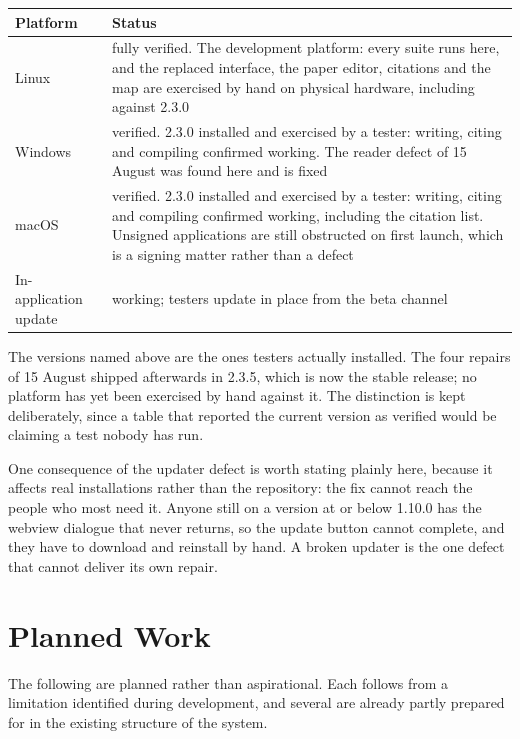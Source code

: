 \documentclass[11pt,a4paper]{article}
\begin{document}
\begin{center}
\small
\begin{tabularx}{\linewidth}{@{}lX@{}}
\toprule
\textbf{Platform} & \textbf{Status} \\
\midrule
Linux & fully verified. The development platform: every suite runs here, and the replaced interface, the paper editor, citations and the map are exercised by hand on physical hardware, including against 2.3.0 \\
Windows & verified. 2.3.0 installed and exercised by a tester: writing, citing and compiling confirmed working. The reader defect of 15 August was found here and is fixed \\
macOS & verified. 2.3.0 installed and exercised by a tester: writing, citing and compiling confirmed working, including the citation list. Unsigned applications are still obstructed on first launch, which is a signing matter rather than a defect \\
In-application update & working; testers update in place from the beta channel \\
\bottomrule
\end{tabularx}
\end{center}

The versions named above are the ones testers actually installed. The four
repairs of 15 August shipped afterwards in 2.3.5, which is now the stable
release; no platform has yet been exercised by hand against it. The distinction
is kept deliberately, since a table that reported the current version as
verified would be claiming a test nobody has run.

One consequence of the updater defect is worth stating plainly here, because it
affects real installations rather than the repository: the fix cannot reach the
people who most need it. Anyone still on a version at or below 1.10.0 has the
webview dialogue that never returns, so the update button cannot complete, and
they have to download and reinstall by hand. A broken updater is the one defect
that cannot deliver its own repair.

\section{Planned Work}

The following are planned rather than aspirational. Each follows from a
limitation identified during development, and several are already partly
prepared for in the existing structure of the system.
\end{document}
